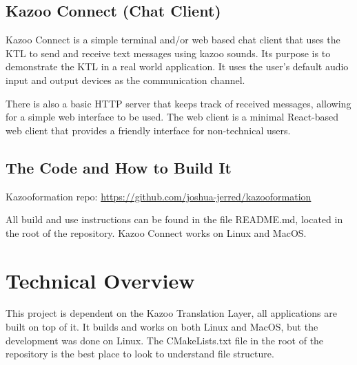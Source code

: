 \documentclass[]{article}
\begin{document}
\subsection{Kazoo Connect (Chat Client)}

Kazoo Connect is a simple terminal and/or web based chat client that uses the KTL to send and receive text messages using kazoo sounds. Its purpose is to demonstrate the KTL in a real world application. It uses the user's default audio input and output devices as the communication channel.

There is also a basic HTTP server that keeps track of received messages, allowing for a simple web interface to be used. The web client is a minimal React-based web client that provides a friendly interface for non-technical users.

\subsection{The Code and How to Build It}
Kazooformation repo: \url{https://github.com/joshua-jerred/kazooformation}

All build and use instructions can be found in the file README.md, located in the root of the repository. Kazoo Connect works on Linux and MacOS.


\section{Technical Overview}



This project is dependent on the Kazoo Translation Layer, all applications are built on top of it. It builds and works on both Linux and MacOS, but the development was done on Linux. The CMakeLists.txt file in the root of the repository is the best place to look to understand file structure.
\end{document}
